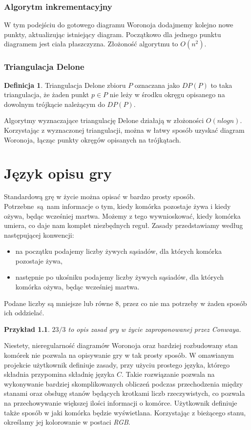 \documentclass[declaration,shortabstract, inz]{iithesis}
\theoremstyle{definition} \newtheorem{definition}{Definicja}[]
\theoremstyle{plain} \newtheorem{remark}[definition]{Obserwacja}
\theoremstyle{plain} \newtheorem{theorem}[definition]{Twierdzenie}
\theoremstyle{plain} \newtheorem{example}{Przykład}[definition]
\theoremstyle{plain} \newtheorem{lemma}[definition]{Lemat}
\begin{document}
\subsection{Algorytm inkrementacyjny}

W tym podejściu do gotowego diagramu Woronoja dodajmemy kolejno nowe punkty, aktualizując istniejący diagram. Początkowo dla jednego punktu diagramem jest ciała płaszczyzna. Złożoność algorytmu to $O(n^2)$.

\subsection{Triangulacja Delone}

\begin{definition}
Triangulacja Delone zbioru $P$ oznaczana jako $DP(P)$ to taka triangulacja, że żaden punkt $p \in P$ nie leży w środku okręgu opisanego na dowolnym trójkącie należącym do $DP(P)$. 
\end{definition}

Algorytmy wyznaczające triangulację Delone działają w złożoności $O(nlogn)$.
Korzystając z wyznaczonej triangulacji, można w łatwy sposób uzyskać diagram Woronoja, łącząc punkty okręgów opisanych na trójkątach. 

\chapter{Język opisu gry}
Standardową grę w życie można opisać w bardzo prosty sposób. Potrzebne~są~nam informacje o tym, kiedy komórka pozostaje żywa i kiedy ożywa, będąc wcześniej martwa. Możemy z tego wywnioskować, kiedy komórka umiera, co daje nam komplet niezbędnych reguł. Zasady przedstawiamy według następującej konwencji:
\begin{itemize}
\item na początku podajemy liczby żywych sąsiadów, dla których komórka pozostaje żywa,
\item następnie po ukośniku podajemy liczby żywych sąsiadów, dla których komórka ożywa, będąc wcześniej martwa.
\end{itemize}

Podane liczby są mniejsze lub równe $8$, przez co nie ma potrzeby w żaden sposób ich oddzielać.

\begin{example}
$23/3$ to opis zasad gry w życie zaproponowanej przez Conwaya.
\end{example}

Niestety, nieregularność diagramów Woronoja oraz bardziej rozbudowany stan komórek nie pozwala na opisywanie gry w tak prosty sposób. W omawianym projekcie użytkownik definiuje zasady, przy użyciu prostego języka, którego składnia przypomina składnię języka $C$. Takie rozwiązanie pozwala na wykonywanie bardziej skomplikowanych obliczeń podczas przechodzenia między stanami oraz obsługę stanów będących krotkami liczb rzeczywistych, co pozwala na przechowywanie większej ilości informacji o komórce. Użytkownik definiuje także sposób w jaki komórka będzie wyświetlana. Korzystając z bieżącego stanu, określamy jej kolorowanie w postaci \textit{RGB}.
\end{document}
